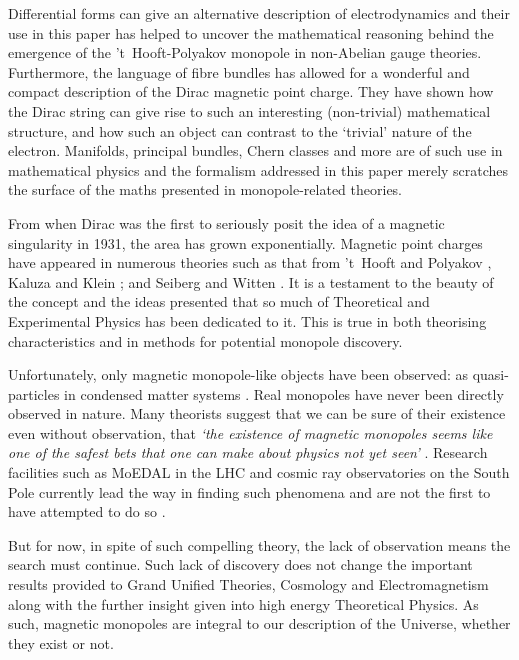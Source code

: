 \documentclass[fleqn, twocolumn, 10pt]{article}
\begin{document}
Differential forms can give an alternative description of electrodynamics and their use in this paper has helped to uncover the mathematical reasoning behind the emergence of the 't~Hooft-Polyakov monopole in non-Abelian gauge theories. Furthermore, the language of fibre bundles has allowed for a wonderful and compact description of the Dirac magnetic point charge. They have shown how the Dirac string can give rise to such an interesting (non-trivial) mathematical structure, and how such an object can contrast to the `trivial' nature of the electron. Manifolds, principal bundles, Chern classes and more are of such use in mathematical physics and the formalism addressed in this paper merely scratches the surface of the maths presented in monopole-related theories. 

From when Dirac was the first to seriously posit the idea of a magnetic singularity in 1931, the area has grown exponentially. Magnetic point charges have appeared in numerous theories such as that from 't~Hooft and Polyakov \cite{tHooft1974gauge, polyakov1996particle}, Kaluza and Klein \cite{bergshoeff1998massive}; and Seiberg and Witten \cite{Seiberg_1994}. It is a testament to the beauty of the concept and the ideas presented that so much of Theoretical and Experimental Physics has been dedicated to it. This is true in both theorising characteristics and in methods for potential monopole discovery. 

Unfortunately, only magnetic monopole-like objects have been observed: as quasi-particles in condensed matter systems \cite{ray2015observation}. Real monopoles have never been directly observed in nature. Many theorists suggest that we can be sure of their existence even without observation, that \textit{`the existence of magnetic monopoles seems like one of the safest bets that one can make about physics not yet seen'} \cite{Polchinski_2004}. Research facilities such as MoEDAL in the LHC and cosmic ray observatories on the South Pole currently lead the way in finding such phenomena and are not the first to have attempted to do so \cite{rajantie2012introduction}.

But for now, in spite of such compelling theory, the lack of observation means the search must continue. Such lack of discovery does not change the important results provided to Grand Unified Theories, Cosmology and Electromagnetism along with the further insight given into high energy Theoretical Physics. As such, magnetic monopoles are integral to our description of the Universe, whether they exist or not.
\end{document}
